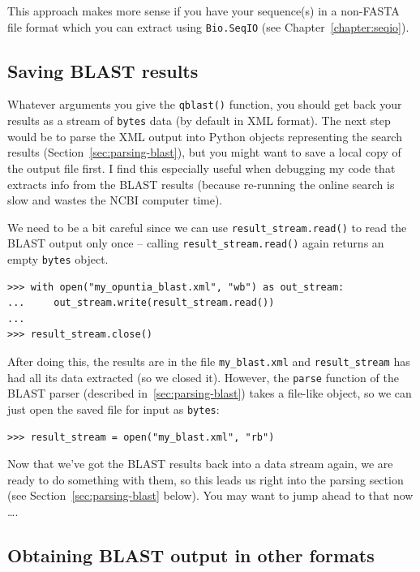 This approach makes more sense if you have your sequence(s) in a
non-FASTA file format which you can extract using \verb|Bio.SeqIO|
(see Chapter~\ref{chapter:seqio}).

\subsection{Saving BLAST results}
\label{subsec:saving-blast-results}

Whatever arguments you give the \verb|qblast()| function, you should
get back your results as a stream of \verb|bytes| data
(by default in XML format).
The next step would be to parse the XML output into Python objects
representing the search results (Section~\ref{sec:parsing-blast}),
but you might want to save a local copy of the output file first.
I find this especially useful when debugging my code that extracts
info from the BLAST results (because re-running the online search
is slow and wastes the NCBI computer time).

We need to be a bit careful since we can use \verb|result_stream.read()| to
read the BLAST output only once -- calling \verb|result_stream.read()| again
returns an empty \verb|bytes| object.

\begin{verbatim}
>>> with open("my_opuntia_blast.xml", "wb") as out_stream:
...     out_stream.write(result_stream.read())
...
>>> result_stream.close()
\end{verbatim}

After doing this, the results are in the file \verb|my_blast.xml| and
\verb|result_stream| has had all its data extracted (so we closed it). However,
the \verb|parse| function of the BLAST parser (described
in~\ref{sec:parsing-blast}) takes a file-like object, so
we can just open the saved file for input as \verb|bytes|:

\begin{verbatim}
>>> result_stream = open("my_blast.xml", "rb")
\end{verbatim}

Now that we've got the BLAST results back into a data stream again, we are ready
to do something with them, so this leads us right into the parsing section
(see Section~\ref{sec:parsing-blast} below). You may want to jump ahead to
that now \ldots.

\subsection{Obtaining BLAST output in other formats}
\label{subsec:blast-other-formats}


